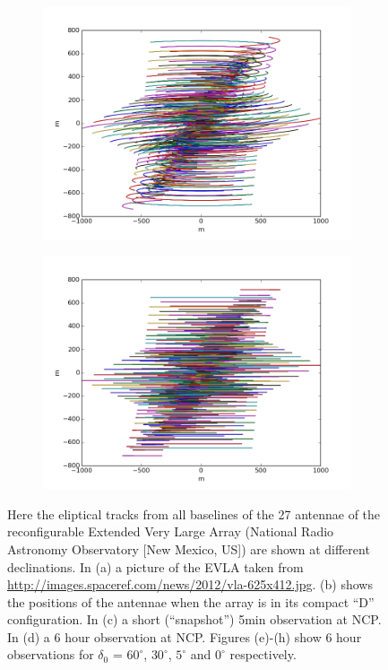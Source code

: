 \documentclass[a4paper,10pt]{report}
\begin{document}
\begin{figure}[h]
\begin{mdframed}
\begin{subfigure}[b]{0.3\textwidth}
  \includegraphics[width=\textwidth]{images/evla_observation/6hr_dec5.png}
  \caption{}
 \end{subfigure}
 \begin{subfigure}[b]{0.3\textwidth}
  \includegraphics[width=\textwidth]{images/evla_observation/6hr_dec0.png}
  \caption{}
 \end{subfigure}
 \caption[u,v coverage]{Here the eliptical tracks from all baselines of the 27 antennae of the reconfigurable 
  Extended Very Large Array (National Radio Astronomy Observatory [New Mexico, US]) are shown at different declinations.
  In (a) a picture of the EVLA taken from \url{http://images.spaceref.com/news/2012/vla-625x412.jpg}. (b) shows the positions of the
  antennae when the array is in its compact ``D'' configuration. In (c) a 
  short (``snapshot'') 5min observation at NCP. In (d) a 6 hour observation at NCP. Figures (e)-(h) show 6 hour 
  observations for $\delta_0$ = $60^{\circ}$, $30^{\circ}$, $5^{\circ}$ and $0^{\circ}$ respectively.}
  \label{fig_evla_observation}
 \end{mdframed}
\end{figure}
\end{document}
